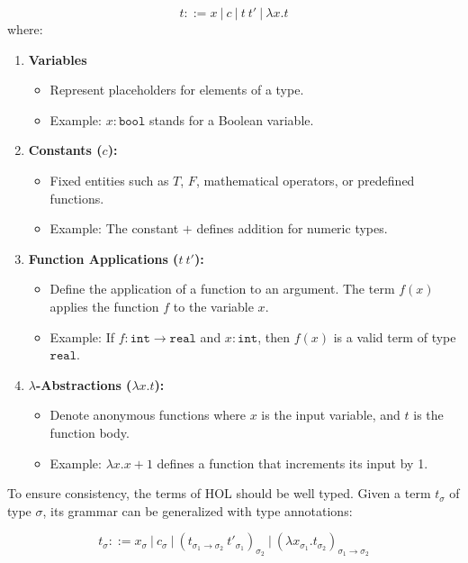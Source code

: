 \[
t ::= x \ | \ c \ | \ t \ t' \ | \ \lambda x. t
\]
where:
\begin{enumerate}
    \item \textbf{Variables} 
    \begin{itemize}
        \item Represent placeholders for elements of a type.
        \item Example: \(x : \texttt{bool}\) stands for a Boolean variable.
    \end{itemize}

    \item \textbf{Constants (\(c\)):}
    \begin{itemize}
        \item Fixed entities such as \(T\), \(F\), mathematical operators, or predefined functions.
        \item  Example: The constant \(+\) defines addition for numeric types.
    \end{itemize}

   \item \textbf{Function Applications (\(t \ t'\)):}
   \begin{itemize}
       \item Define the application of a function to an argument. The term \(f(x)\) applies the function \(f\) to the variable \(x\).
        \item Example: If \(f : \texttt{int} \to \texttt{real}\) and \(x : \texttt{int}\), then \(f(x)\) is a valid term of type \(\texttt{real}\).
   \end{itemize}

\item \textbf{\(\lambda\)-Abstractions (\(\lambda x. t\)):}
\begin{itemize}
    \item Denote anonymous functions where \(x\) is the input variable, and \(t\) is the function body.
    \item Example: \(\lambda x. x + 1\) defines a function that increments its input by 1.
\end{itemize}


\end{enumerate}

To ensure consistency, the terms of HOL should be well typed. Given a term \(t_{\sigma}\) of type \(\sigma\), its grammar can be generalized with type annotations:

\[
t_{\sigma} ::= x_{\sigma} \ | \ c_{\sigma} \ | \ (t_{\sigma_1 \to \sigma_2} \ t'_{\sigma_1})_{\sigma_2} \ | \ (\lambda x_{\sigma_1}. t_{\sigma_2})_{\sigma_1 \to \sigma_2}
\]

